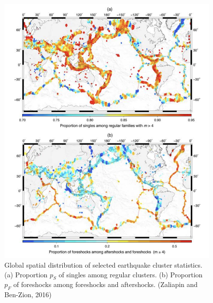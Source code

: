 \documentclass[12pt]{article} %
\theoremstyle{plain}
\begin{document}
	\begin{figure}
		\centering
		\includegraphics[width=0.9\linewidth]{Thesis_Figures,Images,Tables/proportion_of_foreshocks_among_aftershocks}
		\caption{Global spatial distribution of selected earthquake cluster statistics. (a) Proportion $p_S$ of singles among regular clusters. (b) Proportion $p_F$ of foreshocks among foreshocks and aftershocks. (Zaliapin and Ben-Zion, 2016)}
		\label{fig:proportionofforeshocksamongaftershocks}
	\end{figure}
	
\end{document}
